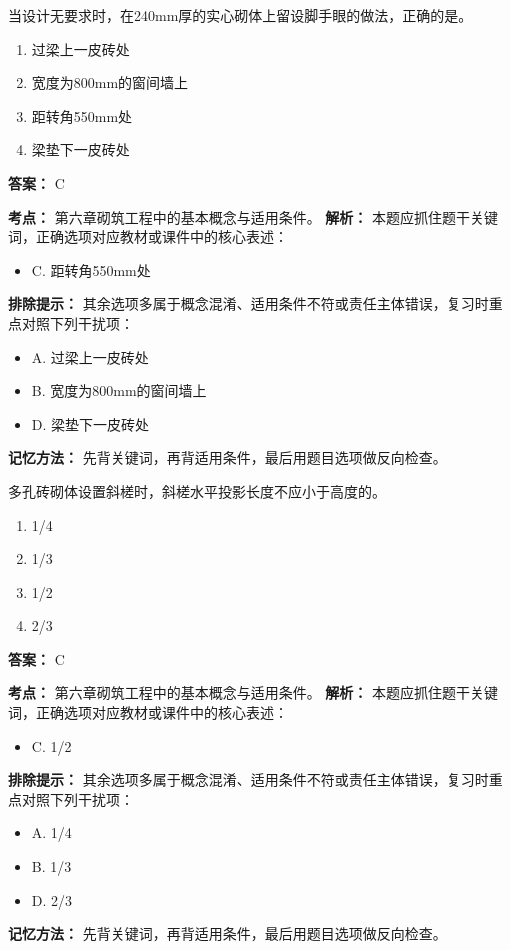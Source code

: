 \documentclass[UTF8,fontset=fandol,11pt]{ctexart}
\begin{document}
\begin{quizbox}[title={第 19 题}]
当设计无要求时，在240mm厚的实心砌体上留设脚手眼的做法，正确的是。\\
\begin{enumerate}[label=\Alph*.]
\item 过梁上一皮砖处
\item 宽度为800mm的窗间墙上
\item 距转角550mm处
\item 梁垫下一皮砖处
\end{enumerate}
\textbf{答案：} C
\vspace{0.25em}
\begin{answerbox}[title={考点解析}]
\textbf{考点：} 第六章砌筑工程中的基本概念与适用条件。
\textbf{解析：} 本题应抓住题干关键词，正确选项对应教材或课件中的核心表述：
\begin{itemize}
\item C. 距转角550mm处
\end{itemize}
\textbf{排除提示：} 其余选项多属于概念混淆、适用条件不符或责任主体错误，复习时重点对照下列干扰项：
\begin{itemize}
\item A. 过梁上一皮砖处
\item B. 宽度为800mm的窗间墙上
\item D. 梁垫下一皮砖处
\end{itemize}
\textbf{记忆方法：} 先背关键词，再背适用条件，最后用题目选项做反向检查。
\end{answerbox}
\end{quizbox}

\vspace{0.2em}

\begin{quizbox}[title={第 20 题}]
多孔砖砌体设置斜槎时，斜槎水平投影长度不应小于高度的。\\
\begin{enumerate}[label=\Alph*.]
\item 1/4
\item 1/3
\item 1/2
\item 2/3
\end{enumerate}
\textbf{答案：} C
\vspace{0.25em}
\begin{answerbox}[title={考点解析}]
\textbf{考点：} 第六章砌筑工程中的基本概念与适用条件。
\textbf{解析：} 本题应抓住题干关键词，正确选项对应教材或课件中的核心表述：
\begin{itemize}
\item C. 1/2
\end{itemize}
\textbf{排除提示：} 其余选项多属于概念混淆、适用条件不符或责任主体错误，复习时重点对照下列干扰项：
\begin{itemize}
\item A. 1/4
\item B. 1/3
\item D. 2/3
\end{itemize}
\textbf{记忆方法：} 先背关键词，再背适用条件，最后用题目选项做反向检查。
\end{answerbox}
\end{quizbox}
\end{document}
